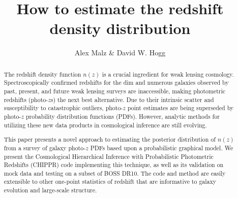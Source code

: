 \documentclass[preprint]{aastex}
\begin{document}
\title{How to estimate the redshift density distribution}

\author{Alex Malz \& David W. Hogg}


\begin{abstract}
The redshift density function $n(z)$ is a crucial ingredient for weak lensing cosmology.  Spectroscopically confirmed redshifts for the dim and numerous galaxies observed by past, present, and future weak lensing surveys are inaccessible, making photometric redshifts (photo-$z$s) the next best alternative.  Due to their intrinsic scatter and susceptibility to catastrophic outliers, photo-$z$ point estimates are being superseded by photo-$z$ probability distribution functions (PDFs).  However, analytic methods for utilizing these new data products in cosmological inference are still evolving.

This paper presents a novel approach to estimating the posterior distribution of $n(z)$ from a survey of galaxy photo-$z$ PDFs based upon a probabilistic graphical model.  We present the Cosmological Hierarchical Inference with Probabilistic Photometric Redshifts (CHIPPR) code implementing this technique, as well as its validation on mock data and testing on a subset of BOSS DR10.  The code and method are easily extensible to other one-point statistics of redshift that are informative to galaxy evolution and large-scale structure.


\end{abstract}
\end{document}
